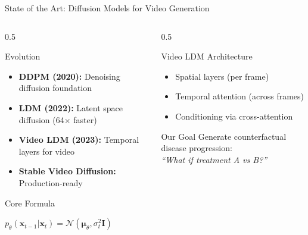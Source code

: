 \documentclass[aspectratio=169]{beamer}
\begin{document}
\begin{frame}{State of the Art: Diffusion Models for Video Generation}
    \begin{columns}
        \begin{column}{0.5\textwidth}
            \begin{block}{Evolution}
                \begin{itemize}
                    \item \textbf{DDPM (2020):} Denoising diffusion foundation
                    \item \textbf{LDM (2022):} Latent space diffusion (64$\times$ faster)
                    \item \textbf{Video LDM (2023):} Temporal layers for video
                    \item \textbf{Stable Video Diffusion:} Production-ready
                \end{itemize}
            \end{block}
            
            \begin{block}{Core Formula}
                \begin{center}
                    $p_\theta(\mathbf{x}_{t-1} | \mathbf{x}_t) = \mathcal{N}(\boldsymbol{\mu}_\theta, \sigma_t^2\mathbf{I})$
                \end{center}
            \end{block}
        \end{column}
        \begin{column}{0.5\textwidth}
            \begin{block}{Video LDM Architecture}
                \begin{itemize}
                    \item Spatial layers (per frame)
                    \item Temporal attention (across frames)
                    \item Conditioning via cross-attention
                \end{itemize}
            \end{block}
            
            \begin{alertblock}{Our Goal}
                Generate counterfactual disease progression: \\
                \textit{``What if treatment A vs B?''}
            \end{alertblock}
        \end{column}
    \end{columns}
\end{frame}
\end{document}
